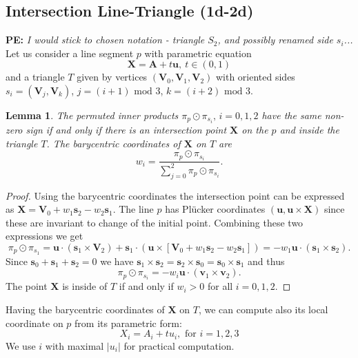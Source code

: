 \documentclass{elsarticle}
\newtheorem{lemma}[theorem]{Lemma}
\def\vc#1{\mathbf{\boldsymbol{#1}}}     %
\newcommand{\notePE}[1]{{\color{Orange} \textbf{PE: } \textit{#1}}}
\newcommand{\plucker}{Pl\"{u}cker }
\begin{document}
\subsection{Intersection Line-Triangle (1d-2d)}
\label{sec:1d-2d}
\notePE{I would stick to chosen notation - triangle $S_2$, and possibly renamed side $s_i$...}
Let us consider a line segment $p$ with parametric equation 
\begin{equation}
    \label{eq:line_parametric}
    \vc X = \vc A + t\vc u,\ t\in (0,1)
\end{equation}
and a triangle $T$ given by vertices $(\vc V_0, \vc V_1, \vc V_2)$ 
with oriented sides $s_i=(\vc V_j, \vc V_k)$, $j=(i+1)\text{ mod }3$, $k=(i+2)\text{ mod }3$. 
\begin{lemma}
The permuted inner products $\pi_p \odot \pi_{s_i},\, i=0,1,2$ have the same non-zero sign if and only if there
is an intersection point $\vc X$ on the $p$ and inside the triangle $T$. 
The barycentric coordinates of $\vc X$ on $T$ are
\begin{equation}
  \label{eq:bary_centric}
   w_i = \frac{\pi_p \odot \pi_{s_i}}{ \sum_{j=0}^{2} \pi_p \odot \pi_{s_i} }.
\end{equation}
\end{lemma}
\begin{proof}
Using the barycentric coordinates the intersection point can be expressed as $\vc X = \vc V_0 + w_1 \vc s_2 - w_2 \vc s_1$.
The line $p$ has \plucker coordinates $(\vc u, \vc u \times \vc X)$ since these are invariant to change of the initial point. 
Combining these two expressions we get
\[
   \pi_p \odot \pi_{s_1} = \vc u \cdot (\vc s_1 \times \vc V_2) + \vc s_1 \cdot ( \vc u \times [\vc V_0 + w_1\vc s_2 - w_2 \vc s_1])
   =-w_1 \vc u \cdot (\vc s_1 \times \vc s_2).
\]
Since $\vc s_0 + \vc s_1 + \vc s_2=0$ we have $ \vc s_1 \times \vc s_2 = \vc s_2 \times \vc s_0 = \vc s_0 \times \vc s_1$ and thus
\[
   \pi_p \odot \pi_{s_i} = -w_i \vc u \cdot (\vc v_1 \times \vc v_2).
\]
The point $\vc X$ is inside of $T$ if and only if $w_i>0$ for all $i=0,1,2$.
\end{proof}
Having the barycentric coordinates of $\vc X$ on $T$, we can compute also its local coordinate on $p$ from its parametric form:
\begin{equation}
   \label{eq:line}
   X_i  = A_i + t u_i, \text{ for } i=1,2,3
\end{equation}
We use $i$ with maximal $|u_i|$ for practical computation. 
\end{document}
